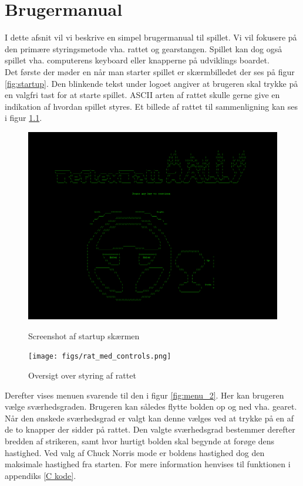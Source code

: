 \chapter{Brugermanual}

I dette afsnit vil vi beskrive en simpel brugermanual til spillet. Vi vil fokusere på den primære styringsmetode vha. rattet og gearstangen. Spillet kan dog også spillet vha. computerens keyboard eller knapperne på udviklings boardet.
\\

Det første der møder en når man starter spillet er skærmbilledet der ses på figur \ref{fig:startup}. Den blinkende tekst under logoet angiver at brugeren skal trykke på en valgfri tast for at starte spillet. ASCII arten af rattet skulle gerne give en indikation af hvordan spillet styres. Et billede af rattet til sammenligning kan ses i figur \ref{fig:rat_med_controls}.

\begin{figure}[h!]
\begin{minipage}[b]{0.49\textwidth}
\includegraphics[width=\linewidth]{figs/screenshots/startup_crop_ny.png}
\caption{Screenshot af startup skærmen}
\label{fig:startup}
\end{minipage}\hfill
\begin{minipage}[b]{0.49\textwidth}
\texttt{[image: figs/rat\_med\_controls.png]}
\caption{Oversigt over styring af rattet}
\label{fig:rat_med_controls}
\end{minipage}\hfill
\end{figure}

Derefter vises menuen svarende til den i figur \ref{fig:menu_2}. Her kan brugeren vælge sværhedsgraden. Brugeren kan således flytte bolden op og ned vha. gearet. Når den ønskede sværhedsgrad er valgt kan denne vælges ved at trykke på en af de to knapper der sidder på rattet. Den valgte sværhedsgrad bestemmer derefter bredden af strikeren, samt hvor hurtigt bolden skal begynde at forøge dens hastighed. Ved valg af Chuck Norris mode er boldens hastighed dog den maksimale hastighed fra starten. For mere information henvises til funktionen  i appendiks \ref{C kode}. \\

